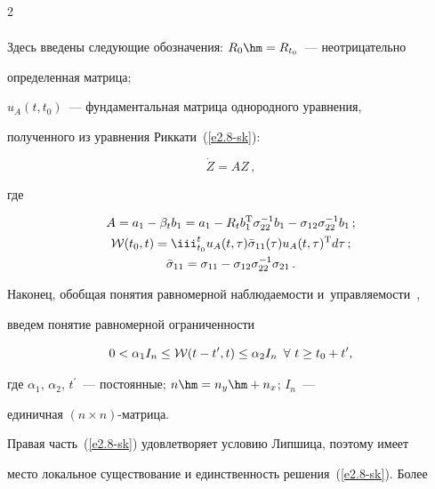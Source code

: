 \begin{multicols}{2}
\begin{multline*}
\end{multline*}

Здесь введены следующие обозначения: $R_0\hm=R_{t_0}$~--- неотрицательно

определенная  матрица;

$u_A(t, t_0)$~--- фундаментальная матрица однородного уравнения,

полученного из уравнения Риккати~(\ref{e2.8-sk}):

\begin{equation}

\dot Z =A Z\,,

\label{e2.14-sk}

\end{equation}

где

\begin{gather}

 A = a_1 -\beta_t b_1 = a_1 - R_t b_1^{\mathrm{T}} \sigma_{22}^{-1}

b_1 - \sigma_{12} \sigma_{22}^{-1} b_1\,;\notag\\

\mathcal{W} (t_0, t) =\iii_{t_0}^t u_A (t, \tau) \bar \sigma_{11} (\tau)

u_A (t,\tau)^{\mathrm{T}} d\tau\,;\label{e2.15-sk}\\

\bar \sigma_{11} =\sigma_{11}-\sigma_{12} \sigma_{22}^{-1} \sigma_{21}\,.\label{e2.16-sk}

\end{gather}

Наконец, обобщая понятия равномерной наблюдаемости и~управляемости~\cite{6-sk, 7-sk},

введем понятие равномерной ограниченности

\begin{equation}

0<\alpha_1 I_n \le \mathcal{W}(t-t^\prime, t)\le \alpha_2 I_n \enskip

\forall\ t \ge t_0+t^\prime,\label{e2.17-sk}

\end{equation}

где $\alpha_1$, $\alpha_2$, $t^\prime$~--- постоянные; $n\hm=n_y\hm+n_x$; $I_n$~---

единичная  $(n\times n)$-мат\-рица.



Правая часть~(\ref{e2.8-sk}) удовлетворяет условию Липшица, поэтому имеет

место локальное существование и единственность решения~(\ref{e2.8-sk}). Более


\end{multicols}

